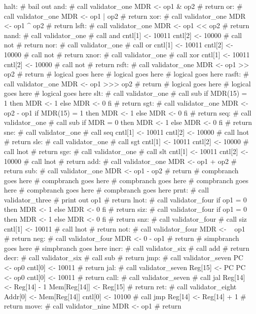 \documentclass[12pt]{article}
\begin{document}
\begin{verbatimtab}
halt:
	# bail out
and:
	# call validator_one
	MDR <- op1 & op2
	# return
or:
	# call validator_one
	MDR <- op1 | op2
	# return
xor:
	# call validator_one
	MDR <- op1 ^ op2
	# return
lsft:
	# call validator_one
	MDR <- op1 << op2
	# return
nand:
	# call validator_one
	# call and
	cntl[1] <- 10011
	cntl[2] <- 10000
	# call not
	# return
nor:
	# call validator_one
	# call or
	cntl[1] <- 10011
	cntl[2] <- 10000
	# call not
	# return
xnor:
	# call validator_one
	# call xor
	cntl[1] <- 10011
	cntl[2] <- 10000
	# call not
	# return
rsft:
	# call validator_one
	MDR <- op1 >> op2
	# return
# logical goes here
# logical goes here
# logical goes here
rasft:
	# call validator_one
	MDR <- op1 >>> op2
	# return
# logical goes here
# logical goes here
# logical goes here
slt:
	# call validator_one
	# call sub
	if MDR(15) = 1 then
		MDR <- 1
	else
		MDR <- 0
	fi
	# return
sgt:
	# call validator_one
	MDR <- op2 - op1
	if MDR(15) = 1 then
		MDR <- 1
	else
		MDR <- 0
	fi
	# return
seq:
	# call validator_one
	# call sub
	if MDR = 0 then
		MDR <- 1
	else
		MDR <- 0
	fi
	# return
sne:
	# call validator_one
	# call seq
	cntl[1] <- 10011
	cntl[2] <- 10000
	# call lnot
	# return
sle:
	# call validator_one
	# call sgt
	cntl[1] <- 10011
	cntl[2] <- 10000
	# call lnot
	# return
sge:
	# call validator_one
	# call slt
	cntl[1] <- 10011
	cntl[2] <- 10000
	# call lnot
	# return
add:
	# call validator_one
	MDR <- op1 + op2
	# return
sub:
	# call validator_one
	MDR <- op1 - op2
	# return
# compbranch goes here
# compbranch goes here
# compbranch goes here
# compbranch goes here
# compbranch goes here
# compbranch goes here
prnt:
	# call validator_three
	# print out op1
	# return
lnot:
	# call validator_four
	if op1 = 0 then
		MDR <- 1
	else
		MDR <- 0
	fi
	# return
siz:
	# call validator_four
	if op1 = 0 then
		MDR <- 1
	else
		MDR <- 0
	fi
	# return
snz:
	# call validator_four
	# call siz
	cntl[1] <- 10011
	# call lnot
	# return
not:
	# call validator_four
	MDR <- ~ op1
	# return
neg:
	# call validator_four
	MDR <- 0 - op1
	# return
# simpbranch goes here
# simpbranch goes here
incr:
	# call validator_six
	# call add
	# return
decr:
	# call validator_six
	# call sub
	# return
jmp:
	# call validator_seven
	PC <- op0
	cntl[0] <- 10011
	# return
jal:
	# call validator_seven
	Reg[15] <- PC
	PC <- op0
	cntl[0] <- 10011
	# return
call:
	# call validator_seven
	# call jal
	Reg[14] <- Reg[14] - 1
	Mem[Reg[14]] <- Reg[15]
	# return
ret:
	# call validator_eight
	Addr[0] <- Mem[Reg[14]]
	cntl[0] <- 10100
	# call jmp
	Reg[14] <- Reg[14] + 1
	# return
move:
	# call validator_nine
	MDR <- op1
	# return


\end{verbatimtab}
\end{document}
